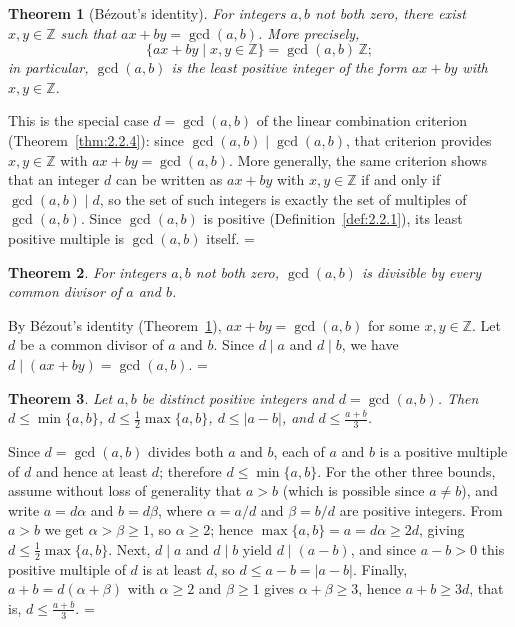 \documentclass[11pt]{article}
\makeatletter
\let\nt@closedisplay\]
\def\nt@guardedclose{\@ifnextchar\par{\nt@closeafterpar}{\@ifnextchar\end{\postdisplaypenalty\@M\nt@closedisplay}{\nt@closedisplay}}}
\def\nt@closeafterpar\par{\@ifnextchar\par{\nt@closeafterpar}{\@ifnextchar\end{\postdisplaypenalty\@M\nt@closedisplay\par}{\nt@closedisplay\par}}}
\renewenvironment{proof}[1][\proofname]{\par
  \pushQED{\qed}\normalfont\topsep\medskipamount\edef\nt@afterproof{\@endparpenalty=\the\@endparpenalty\relax}\@beginparpenalty\@M\@endparpenalty\@M\let\]\nt@guardedclose\trivlist\item[]\textit{#1\@addpunct{.}} \ignorespaces}{\ifvmode\addpenalty\@M\fi\popQED\nt@afterproof\endtrivlist\@endpefalse}
\theoremstyle{ntstyle}
\newtheorem{theorem}{Theorem}[subsection]
\makeatother
\begin{document}
\begin{theorem}[Bézout's identity]\label{thm:2.2.5}\label{thm:bezout-identity}
  For integers
  $a, b$ not both zero, there exist $x, y \in \mathbb{Z}$ such that
  $ax + by = \gcd(a, b)$. More precisely,
  \[
    \{ax+by \mid x,y\in\mathbb{Z}\}=\gcd(a, b)\,\mathbb{Z};
  \]
  in particular, $\gcd(a, b)$ is the least positive integer of the form
  $ax+by$ with $x,y\in\mathbb{Z}$.

\end{theorem}

\begin{proof} This is the special case $d = \gcd(a, b)$ of
  the linear combination criterion (Theorem~\ref{thm:2.2.4}): since $\gcd(a, b) \mid \gcd(a, b)$, that criterion
  provides $x, y \in \mathbb{Z}$ with
  $ax + by = \gcd(a, b)$.
  More generally, the same criterion shows that an integer $d$ can be written as
  $ax+by$ with $x,y\in\mathbb{Z}$ if and only if $\gcd(a, b)\mid d$, so the set
  of such integers is exactly the set of multiples of $\gcd(a, b)$. Since
  $\gcd(a, b)$ is positive (Definition~\ref{def:2.2.1}), its least positive
  multiple is $\gcd(a, b)$ itself.
\end{proof}

\begin{theorem}\label{thm:2.2.6}
  For integers $a, b$ not both zero, $\gcd(a, b)$ is divisible by every common divisor of $a$ and $b$.

\end{theorem}

\begin{proof} By Bézout's identity (Theorem~\ref{thm:2.2.5}), $ax+by = \gcd(a, b)$ for some $x, y \in \mathbb{Z}$. Let $d$ be a common
  divisor of $a$ and $b$. Since $d \mid a$ and $d \mid b$, we have $d \mid (ax+by) = \gcd(a, b)$.
\end{proof}

\begin{theorem}\label{thm:2.2.7} Let $a,b$ be distinct positive integers and
  $d=\gcd(a, b)$. Then $d\le\min\{a, b\}$, $d\le\tfrac{1}{2}\max\{a, b\}$,
  $d\le|a-b|$, and $d\le\tfrac{a+b}{3}$.

\end{theorem}

\begin{proof} Since $d=\gcd(a, b)$ divides both $a$ and
  $b$, each of $a$ and $b$ is a positive multiple of $d$ and hence at least
    $d$; therefore $d\le\min\{a, b\}$. For the other three bounds, assume
  without loss of generality that $a>b$ (which is possible since $a\neq b$), and
  write $a=d\alpha$ and $b=d\beta$, where $\alpha=a/d$ and
  $\beta=b/d$ are positive integers. From $a>b$ we get
  $\alpha>\beta\ge1$, so $\alpha\ge2$; hence
  $\max\{a, b\}=a=d\alpha\ge2d$, giving $d\le\tfrac{1}{2}\max\{a, b\}$. Next,
  $d\mid a$ and $d\mid b$ yield $d\mid(a-b)$, and since
  $a-b>0$ this positive multiple of $d$ is at least $d$, so $d\le a-b=|a-b|$. Finally, $a+b=d(\alpha+\beta)$ with
  $\alpha\ge2$ and
  $\beta\ge1$ gives $\alpha+\beta\ge3$, hence $a+b\ge3d$, that is, $d\le\tfrac{a+b}{3}$.
\end{proof}
\end{document}
